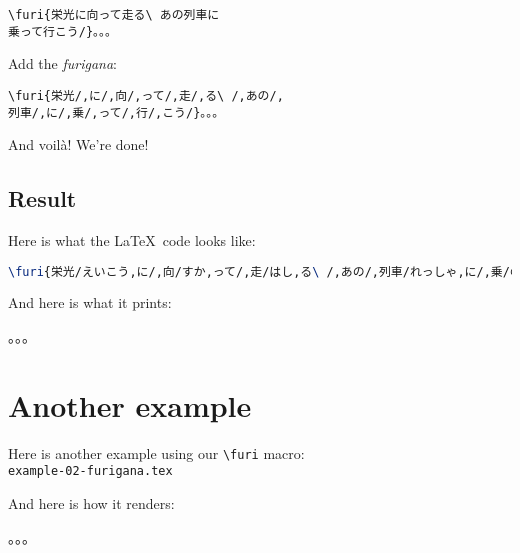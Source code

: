\begin{mdframed}
\texttt{\textbackslash furi\{栄光\stress{/,}に\stress{/,}向\stress{/,}って\stress{/,}走\stress{/,}る\textbackslash\ \stress{/,}あの\stress{/,}列車\stress{/,}に\stress{/,}\\乗\stress{/,}って\stress{/,}行\stress{/,}こう/\}。。。
}
\end{mdframed}

Add the \emph{furigana}:

\begin{mdframed}
\texttt{\textbackslash furi\{栄光/,に/,向/,って/,走/,る\textbackslash\  /,あの/,\\ 
列車/,に/,乗/,って/,行/,こう/\}。。。
}
\end{mdframed}

And voilà! We're done! \\



\bigskip


\subsection*{Result}

Here is what the \LaTeX\ code looks like:

\begin{lstlisting}[language=tex]
\furi{栄光/えいこう,に/,向/すか,って/,走/はし,る\ /,あの/,列車/れっしゃ,に/,乗/の,って/,行/ゆ,こう/}。。。
\end{lstlisting}

And here is what it prints:
\begin{mdframed}
。。。
\end{mdframed}

\bigskip

\newpage

\section*{Another example}

Here is another example using our \lstinline|\furi| macro: \\

\texttt{example-02-furigana.tex}


\bigskip
\bigskip

And here is how it renders:\par
\begin{mdframed}%
\hphantom{.}\par
{}\par
{}\par
{}\par
。。。\
\end{mdframed}